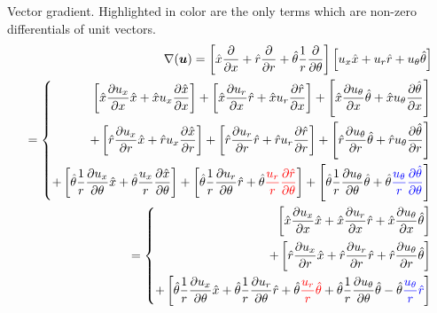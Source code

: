 \documentclass{kthreport}
\begin{document}
Vector gradient. Highlighted in color are the only terms which are non-zero differentials of unit vectors.
\begin{eqnarray}
	\nabla(\bm{u}) = \left[\hat{x}\frac{\partial}{\partial x} + \hat{r}\frac{\partial}{\partial r} + \hat{\theta}\frac{1}{r}\frac{\partial}{\partial \theta} \right]\left[u_{x}\hat{x} + u_{r}\hat{r} + u_{\theta}\hat{\theta}\right] \nonumber \\
	= \left\{\begin{split}
	\left[\hat{x}\frac{\partial u_{x}}{\partial x} \hat{x} + \hat{x}u_{x}\frac{\partial \hat{x}}{\partial x} \right] 
	+ \left[\hat{x}\frac{\partial u_{r}}{\partial x}\hat{r} + \hat{x}u_{r}\frac{\partial \hat{r}}{\partial x} \right] 
	+ \left[\hat{x}\frac{\partial u_{\theta}}{\partial x}\hat{\theta}	+ \hat{x}u_{\theta}\frac{\partial \hat{\theta}}{\partial x}\right] \\
	+ \left[\hat{r}\frac{\partial u_{x}}{\partial r}\hat{x} + \hat{r}u_{x}\frac{\partial \hat{x}}{\partial r} \right] 
	+ \left[\hat{r}\frac{\partial u_{r}}{\partial r}\hat{r} + \hat{r}u_{r}\frac{\partial \hat{r}}{\partial r} \right] 
	+ \left[\hat{r}\frac{\partial u_{\theta}}{\partial r}\hat{\theta} + \hat{r}u_{\theta}\frac{\partial \hat{\theta}}{\partial r}\right] \\
	+ \left[\hat{\theta}\frac{1}{r}\frac{\partial u_{x}}{\partial \theta}\hat{x} + 	\hat{\theta}\frac{u_{x}}{r}\frac{\partial \hat{x}}{\partial \theta}\right]
	+ \left[\hat{\theta}\frac{1}{r}\frac{\partial u_{r}}{\partial \theta}\hat{r} + 	\hat{\theta}\color{red}{\frac{u_{r}}{r}\frac{\partial \hat{r}}{\partial \theta}} \color{black} \right]
	+ \left[\hat{\theta}\frac{1}{r}\frac{\partial u_{\theta}}{\partial \theta}\hat{\theta} +  \hat{\theta}\color{blue}{\frac{u_{\theta}}{r}\frac{\partial \hat{\theta}}{\partial \theta}} \color{black}\right]
	\end{split}\right. \\
%
= \left\{\begin{split}
	\left[\hat{x}\frac{\partial u_{x}}{\partial x} \hat{x} + \hat{x}\frac{\partial u_{r}}{\partial x}\hat{r} + \hat{x}\frac{\partial u_{\theta}}{\partial x}\hat{\theta}	\right] \\
	+ \left[\hat{r}\frac{\partial u_{x}}{\partial r}\hat{x} + \hat{r}\frac{\partial u_{r}}{\partial r}\hat{r} + \hat{r}\frac{\partial u_{\theta}}{\partial r}\hat{\theta} \right] \\
	+ \left[\hat{\theta}\frac{1}{r}\frac{\partial u_{x}}{\partial \theta}\hat{x} + 	 \hat{\theta}\frac{1}{r}\frac{\partial u_{r}}{\partial \theta}\hat{r} + 	\hat{\theta}\color{red}{\frac{u_{r}}{r}\hat{\theta}} \color{black} 
	+ \hat{\theta}\frac{1}{r}\frac{\partial u_{\theta}}{\partial \theta}\hat{\theta} -  \hat{\theta}\color{blue}{\frac{u_{\theta}}{r}\hat{r}} \color{black}\right]
\end{split}\right.
\end{eqnarray}
\end{document}
